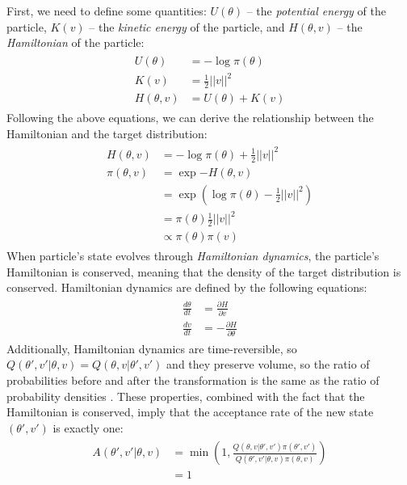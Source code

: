 \documentclass[12pt]{article}
\begin{document}
First, we need to define some quantities: $U(\theta)$ -- the \textit{potential energy} of the particle, $K(v)$ -- the \textit{kinetic energy} of the particle, and $H(\theta, v)$ -- the \textit{Hamiltonian} of the particle:
\begin{align}
\begin{split}
U(\theta) &= -\log \pi(\theta) \\
K(v) &= \frac{1}{2} ||v||^2 \\
H(\theta, v) &= U(\theta) + K(v)
\end{split}
\label{eq_hamiltonian}
\end{align}
Following the above equations, we can derive the relationship between the Hamiltonian and the target distribution:
\begin{align}
\begin{split}
H(\theta, v) &= -\log \pi(\theta) + \frac{1}{2}||v||^2 \\
\pi(\theta, v) &= \exp {-H(\theta, v)} \\
&= \exp \left(\log \pi(\theta) - \frac{1}{2}||v||^2 \right) \\
&= \pi(\theta) \frac{1}{2}||v||^2 \\
&\propto \pi(\theta) \pi(v)
\end{split}
\end{align}
When particle's state evolves through \textit{Hamiltonian dynamics}, the particle's Hamiltonian is conserved, meaning that the density of the target distribution is conserved. Hamiltonian dynamics are defined by the following equations:
\begin{align}
\begin{split}
\frac{d\theta}{dt} &= \frac{\partial H}{\partial v} \\
\frac{dv}{dt} &= -\frac{\partial H}{\partial \theta}
\end{split}
\label{eq_ham_dynamics}
\end{align}
Additionally, Hamiltonian dynamics are time-reversible, so $Q(\theta',v'|\theta,v) = Q(\theta,v|\theta',v')$ and they preserve volume, so the ratio of probabilities before and after the transformation is the same as the ratio of probability densities . These properties, combined with the fact that the Hamiltonian is conserved, imply that the acceptance rate of the new state $(\theta', v')$ is exactly one:
\begin{align}
\begin{split}
A(\theta',v'|\theta,v) &= \min \left(1, \frac{Q(\theta,v|\theta',v')\pi(\theta',v')}{Q(\theta',v'|\theta,v)\pi(\theta,v)} \right) \\
&= 1
\end{split}
\end{align}
\end{document}
